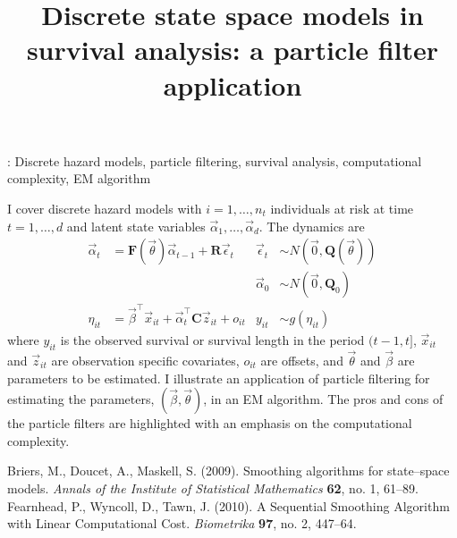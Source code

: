 \title{Discrete state space models in survival analysis: a particle filter application}

\smallskip

: Discrete hazard models, particle filtering, survival analysis, computational complexity, EM algorithm 

\bigskip

I cover discrete hazard models with $i=1,\dots,n_t$ individuals at risk at time $t=1,\dots,d$ and latent state variables $\vec{\alpha}_1,\dots,\vec{\alpha}_d$. The dynamics are %
%
\begin{align*}
  \vec{\alpha}_t &= \mathbf{F}(\vec{\theta}) \vec{\alpha}_{t-1} + \mathbf{R}\vec{\epsilon}_t
      & \vec{\epsilon}_t &\sim N(\vec{0}, \mathbf{Q}(\vec{\theta})) \\
%
  & & \vec{\alpha}_0 &\sim N(\vec{0}, \mathbf{Q}_0) \\
%
  \eta_{it} &= \vec{\beta}^\top\vec{x}_{it} + \vec{\alpha}_t^\top\mathbf{C}\vec{z}_{it} + o_{it} 
      & y_{it} &\sim g(\eta_{it})
\end{align*}%
% 
where $y_{it}$ is the observed survival or survival length in the period $(t - 1,t]$, $\vec{x}_{it}$ and $\vec{z}_{it}$ are observation specific covariates, $o_{it}$ are offsets, and $\vec{\theta}$ and $\vec{\beta}$ are parameters to be estimated. I illustrate an application of particle filtering for estimating the parameters, $(\vec{\beta}, \vec{\theta})$, in an EM algorithm. The pros and cons of the particle filters are highlighted with an emphasis on the computational complexity. 



\begin{thebibliography}{1}
Briers, M., Doucet, A., Maskell, S. (2009). Smoothing algorithms for state--space models. \textit{Annals of the Institute of Statistical Mathematics} \textbf{62}, no. 1, 61--89.
%
Fearnhead, P., Wyncoll, D., Tawn, J. (2010). A Sequential Smoothing Algorithm with Linear Computational Cost. \textit{Biometrika} \textbf{97}, no. 2, 447--64.

\end{thebibliography}
